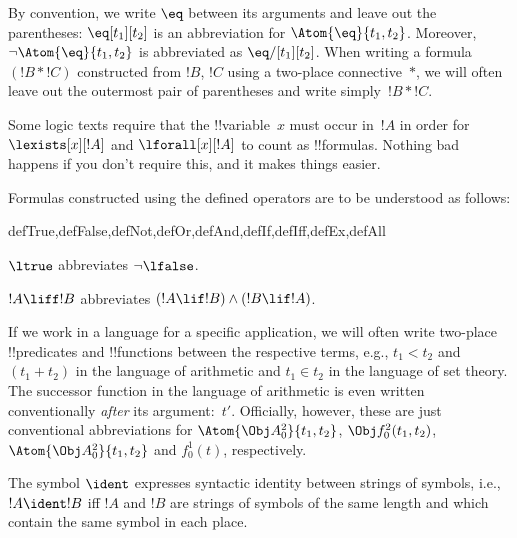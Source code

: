By convention, we write $\eq$ between its arguments and leave out the
parentheses: $\eq[t_1][t_2]$ is an abbreviation for
$\Atom{\eq}{t_1,t_2}$.  Moreover, $\lnot \Atom{\eq}{t_1,t_2}$ is
abbreviated as $\eq/[t_1][t_2]$. When writing a formula $(!B \ast !C)$
constructed from $!B$, $!C$ using a two-place connective~$\ast$, we
will often leave out the outermost pair of parentheses and write
simply~$!B \ast !C$.

\begin{intro}
Some logic texts require that the !!{variable}~$x$ must occur in~$!A$
in order for
$\lexists[x][!A]$ 
and 
$\lforall[x][!A]$ 
to count as
!!{formula}s.
Nothing bad happens if you don't require this, and it makes things
easier.
\end{intro}


\begin{defn}
Formulas constructed using the defined operators are to be understood
as follows:

\begin{tagenumerate}{defTrue,defFalse,defNot,defOr,defAnd,defIf,defIff,defEx,defAll}

$\ltrue$ abbreviates
  $\lnot\lfalse$.











$!A \liff !B$ abbreviates $(!A \lif !B) \land (!B
  \lif !A)$.




\end{tagenumerate}
\end{defn}


If we work in a language for a specific application, we will often
write two-place !!{predicate}s and !!{function}s between the
respective terms, e.g., $t_1 < t_2$ and $(t_1 + t_2)$ in the language
of arithmetic and $t_1 \in t_2$ in the language of set theory.  The
successor function in the language of arithmetic is even written
conventionally \emph{after} its argument:~$t'$.  Officially, however,
these are just conventional abbreviations for $\Atom{\Obj A^2_0}{t_1, t_2}$,
$\Obj f^2_0(t_1, t_2)$, $\Atom{\Obj A^2_0}{t_1, t_2}$ and $f^1_0(t)$,
respectively.

\begin{defn}
The symbol $\ident$ expresses syntactic identity between strings of
symbols, i.e., $!A \ident !B$ iff $!A$ and $!B$ are strings of symbols
of the same length and which contain the same symbol in each place.
\end{defn}

